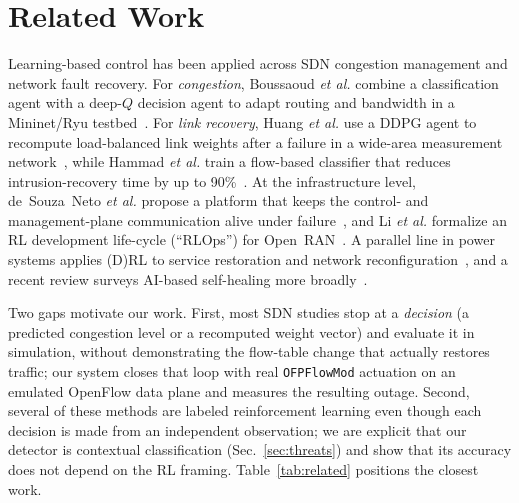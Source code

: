 \documentclass[conference]{IEEEtran}
\begin{document}
\section{Related Work}
\label{sec:related}
Learning-based control has been applied across SDN congestion management and
network fault recovery. For \emph{congestion}, Boussaoud \emph{et al.} combine a
classification agent with a deep-$Q$ decision agent to adapt routing and bandwidth
in a Mininet/Ryu testbed~\cite{boussaoud2025}. For \emph{link recovery}, Huang
\emph{et al.} use a DDPG agent to recompute load-balanced link weights after a
failure in a wide-area measurement network~\cite{huang2025}, while Hammad
\emph{et al.} train a flow-based classifier that reduces intrusion-recovery time by
up to 90\%~\cite{hammad2023}. At the infrastructure level, de~Souza~Neto
\emph{et al.} propose a platform that keeps the control- and management-plane
communication alive under failure~\cite{neto2020}, and Li \emph{et al.} formalize an
RL development life-cycle (``RLOps'') for Open~RAN~\cite{li2022rlops}. A parallel
line in power systems applies (D)RL to service restoration and network
reconfiguration~\cite{ferreira2019,jo2024}, and a recent review surveys AI-based
self-healing more broadly~\cite{kumar2023}.

Two gaps motivate our work. First, most SDN studies stop at a \emph{decision}
(a predicted congestion level or a recomputed weight vector) and evaluate it in
simulation, without demonstrating the flow-table change that actually restores
traffic; our system closes that loop with real \texttt{OFPFlowMod} actuation on an
emulated OpenFlow data plane and measures the resulting outage. Second, several of
these methods are labeled reinforcement learning even though each decision is made
from an independent observation; we are explicit that our detector is contextual
classification (Sec.~\ref{sec:threats}) and show that its accuracy does not depend
on the RL framing. Table~\ref{tab:related} positions the closest work.
\end{document}
